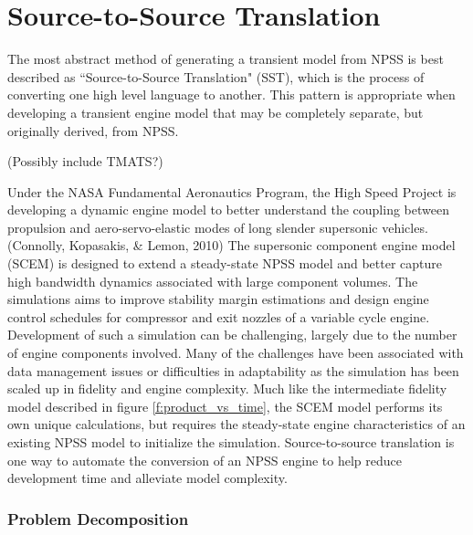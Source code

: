 \documentclass[heading.tex]{subfiles}
\begin{document}
\section{Source-to-Source Translation}

The most abstract method of generating a transient model from NPSS is best described as ``Source-to-Source Translation"
(SST), which is the process of converting one high level language to another. This pattern is appropriate when developing
a transient engine model that may be completely separate, but originally derived, from NPSS.


(Possibly include TMATS?)

	Under the NASA Fundamental Aeronautics Program, the High Speed Project is developing a dynamic engine model
to better understand the coupling between propulsion and  aero-servo-elastic modes of long slender
supersonic vehicles. (Connolly, Kopasakis, \& Lemon, 2010) The supersonic component engine model (SCEM) is 
designed to extend a steady-state NPSS model and better capture high bandwidth dynamics associated with large
component volumes. The simulations aims to improve stability margin estimations and design engine control schedules
for compressor and exit nozzles of a variable cycle engine. Development of such a simulation can be challenging,
largely due to the number of engine components involved. Many of the challenges have been associated with data
management issues or difficulties in adaptability as the simulation has been scaled up in fidelity and engine complexity. 
Much like the intermediate fidelity model described in figure \ref{f:product_vs_time}, the SCEM model performs its
own unique calculations, but requires the steady-state engine characteristics of an existing NPSS model to initialize
the simulation. Source-to-source translation is one way to automate the conversion of an NPSS engine to help
reduce development time and alleviate model complexity.

\subsubsection{Problem Decomposition}
\end{document}

